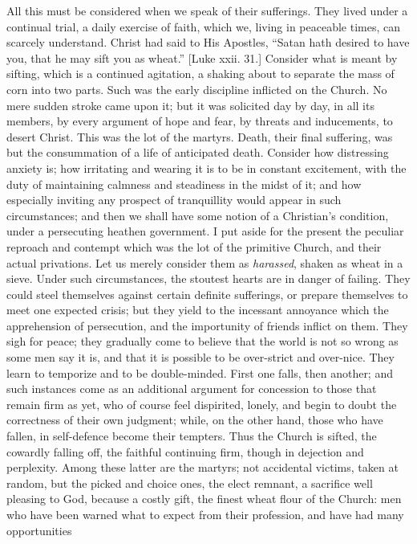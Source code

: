 All this must be considered when we speak of their sufferings. They
lived under a continual trial, a daily exercise of faith, which we,
living in peaceable times, can scarcely understand. Christ had said to
His Apostles, ``Satan hath desired to have you, that he may sift
you as wheat.'' [Luke xxii. 31.] Consider what is meant by
sifting, which is a continued agitation, a shaking about to separate
the mass of corn into two parts. Such was the early discipline
inflicted on the Church. No mere sudden stroke came upon it; but it
was solicited day by day, in all its members, by every argument of
hope and fear, by threats and inducements, to desert Christ. This was
the lot of the martyrs. Death, their final suffering, was but the
consummation of a life of anticipated death. Consider how distressing
anxiety is; how irritating and wearing it is to be in constant
excitement, with the duty of maintaining calmness and steadiness in
the midst of it; and how especially inviting any prospect of
tranquillity would appear in such circumstances; and then we shall
have some notion of a Christian's condition, under a persecuting
heathen government. I put aside for the present the peculiar reproach
and contempt which was the lot of the primitive Church, and their
actual privations. Let us merely consider them as \emph{harassed},
shaken as wheat in a sieve. Under such circumstances, the stoutest
hearts are in danger of failing. They could steel themselves against
certain definite sufferings, or prepare themselves to meet one
expected crisis; but they yield to the incessant annoyance which the
apprehension of persecution, and the importunity of friends inflict on
them. They sigh for peace; they gradually come to believe that the
world is not so wrong as some men say it is, and that it is possible
to be over-strict and over-nice. They learn to temporize and to be
double-minded. First one falls, then another; and such instances come
as an additional argument for concession to those that remain firm as
yet, who of course feel dispirited, lonely, and begin to doubt the
correctness of their own judgment; while, on the other hand, those who
have fallen, in self-defence become their tempters. Thus the Church is
sifted, the cowardly falling off, the faithful continuing firm, though
in dejection and perplexity. Among these latter are the martyrs; not
accidental victims, taken at random, but the picked and choice ones,
the elect remnant, a sacrifice well pleasing to God, because a costly
gift, the finest wheat flour of the Church: men who have been warned
what to expect from their profession, and have had many opportunities
